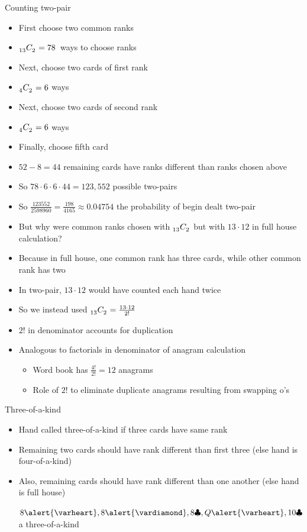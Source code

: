 \documentclass{beamer}
\theoremstyle{definition}
\newcommand\ncr[2]{\tensor[_{#1}]C{_{#2}}}
\newcommand{\hs}{\alert{\varheart}}
\newcommand{\ds}{\alert{\vardiamond}}
\newcommand{\cs}{\clubsuit}
\begin{document}
\begin{frame}{Counting two-pair}
\begin{itemize}
\item First choose two common ranks
\item $\ncr{13}{2}=78$~ways to choose ranks
\item Next, choose two cards of first rank
\item $\ncr{4}{2}=6$ ways
\item Next, choose two cards of second rank
\item $\ncr{4}{2}=6$ ways
\item Finally, choose fifth card
\item $52-8=44$ remaining cards have ranks different
than ranks chosen above
\item So $78\cdot 6\cdot 6\cdot 44=123,552$ possible two-pairs
\item So $\frac{123552}{2598960}=\frac{198}{4165}\approx 0.04754$
the probability of begin dealt two-pair
\end{itemize}
\end{frame}

\begin{frame}
\begin{itemize}
\item But why were common ranks chosen with $\ncr{13}{2}$
but with $13\cdot 12$ in full house calculation?
\item Because in full house, one common rank has \alert{three}
cards, while other common rank has \alert{two}
\item In two-pair, $13\cdot 12$ would have counted
each hand \alert{twice}
\item So we instead used
$\ncr{13}{2}=\frac{13\cdot 12}{2!}$
\item $2!$ in denominator accounts for duplication
\item Analogous to factorials in denominator of
anagram calculation
\begin{example}
\begin{itemize}
\item Word \alert{book} has
$\frac{4!}{2!}=12$ anagrams
\item Role of $2!$ to eliminate duplicate anagrams
resulting from swapping o's
\end{itemize}
\end{example}
\end{itemize}
\end{frame}

\begin{frame}{Three-of-a-kind}
\begin{itemize}
\item Hand called \alert{three-of-a-kind} if
three cards have same rank
\item Remaining two cards should have rank different
than first three (else hand is four-of-a-kind)
\item Also, remaining cards should have rank
different than one another (else hand is full house)
\begin{example} $8\hs,8\ds,8\cs,Q\hs,10\cs$ a three-of-a-kind\end{example}
\end{itemize}
\end{frame}
\end{document}
